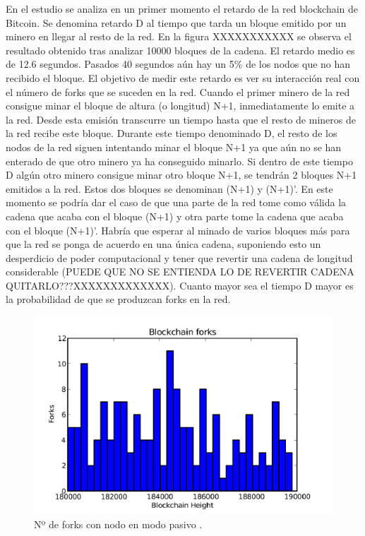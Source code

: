 En el estudio se analiza en un primer momento el retardo de la red blockchain de Bitcoin. Se denomina retardo D al tiempo que tarda un bloque emitido por un minero en llegar al resto de la red. En la figura XXXXXXXXXXX se observa el resultado obtenido tras analizar 10000 bloques de la cadena. El retardo medio es de 12.6 segundos. Pasados 40 segundos aún hay un 5\% de los nodos que no han recibido el bloque. El objetivo de medir este retardo es ver su interacción real con el número de forks que se suceden en la red. Cuando el primer minero de la red consigue minar el bloque de altura (o longitud) N+1, inmediatamente lo emite a la red. Desde esta emisión transcurre un tiempo hasta que el resto de mineros de la red recibe este bloque. Durante este tiempo denominado D, el resto de los nodos de la red siguen intentando minar el bloque N+1 ya que aún no se han enterado de que otro minero ya ha conseguido minarlo. Si dentro de este tiempo D algún otro minero consigue minar otro bloque N+1, se tendrán 2 bloques N+1 emitidos a la red. Estos dos bloques se denominan (N+1) y (N+1)’. En este momento se podría dar el caso de que una parte de la red tome como válida la cadena que acaba con el bloque (N+1) y otra parte tome la cadena que acaba con el bloque (N+1)’. Habría que esperar al minado de varios bloques más para que la red se ponga de acuerdo en una única cadena, suponiendo esto un desperdicio de poder computacional y tener que revertir una cadena de longitud considerable (PUEDE QUE NO SE ENTIENDA LO DE REVERTIR CADENA QUITARLO???XXXXXXXXXXXXX). Cuanto mayor sea el tiempo D mayor es la probabilidad de que se produzcan forks en la red. \newline

\begin{figure}
	\centering
	\includegraphics[width=1\textwidth]{imagenes/figura2.PNG}
	\caption{\label{fig1}Nº de forks con nodo en modo pasivo \cite{forks}.}
\end{figure}

